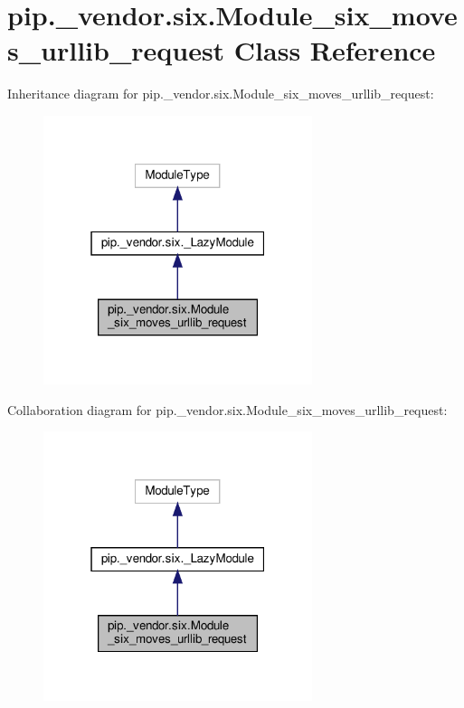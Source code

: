 \hypertarget{classpip_1_1__vendor_1_1six_1_1Module__six__moves__urllib__request}{}\section{pip.\+\_\+vendor.\+six.\+Module\+\_\+six\+\_\+moves\+\_\+urllib\+\_\+request Class Reference}
\label{classpip_1_1__vendor_1_1six_1_1Module__six__moves__urllib__request}


Inheritance diagram for pip.\+\_\+vendor.\+six.\+Module\+\_\+six\+\_\+moves\+\_\+urllib\+\_\+request\+:
\nopagebreak
\begin{figure}[H]
\begin{center}
\leavevmode
\includegraphics[width=223pt]{classpip_1_1__vendor_1_1six_1_1Module__six__moves__urllib__request__inherit__graph}
\end{center}
\end{figure}


Collaboration diagram for pip.\+\_\+vendor.\+six.\+Module\+\_\+six\+\_\+moves\+\_\+urllib\+\_\+request\+:
\nopagebreak
\begin{figure}[H]
\begin{center}
\leavevmode
\includegraphics[width=223pt]{classpip_1_1__vendor_1_1six_1_1Module__six__moves__urllib__request__coll__graph}
\end{center}
\end{figure}
